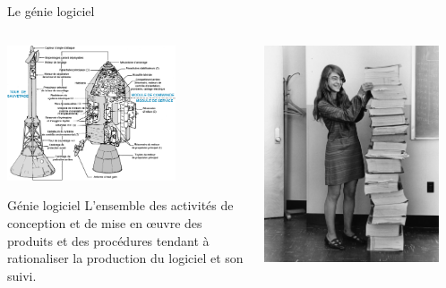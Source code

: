 \begin{frame}{Le génie logiciel}
  \begin{columns}
    \begin{column}{0.6\textwidth}
      \begin{center}
        \includegraphics[height=4cm]{media/apollo.png}
      \end{center}
      \begin{block}{Génie logiciel}
        L'ensemble des activités de conception et de mise en œuvre des produits et des procédures tendant à rationaliser la production du logiciel et son suivi.
      \end{block}
    \end{column}
    \begin{column}{0.4\textwidth}
      \begin{center}
        \includegraphics[width=0.9\textwidth]{media/MHamilton.jpg}
      \end{center}
    \end{column}
  \end{columns}
\end{frame}

